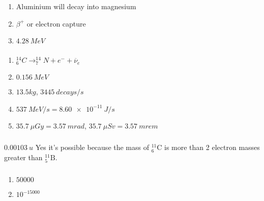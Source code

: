 \documentclass{article}
\begin{document}
\begin{enumerate}
  \item Aluminium will decay into magnesium

  \item $\beta^+$ or electron capture

  \item $\qty{4.28}{MeV}$
\end{enumerate}

\setcounter{subsubsection}{54}
\subsubsection{}

\begin{enumerate}
  \item $^{14}_6 C \rightarrow ^{14}_7 N + e^- + \overline{\nu}_e$

  \item $\qty{0.156}{MeV}$

  \item $\num{13.5}{kg}$, $\qty{3445}{decays/s}$

  \item $\qty{537}{MeV/s} = \qty{8.60e-11}{J/s}$

  \item $\qty{35.7}{\mu Gy} = \qty{3.57}{mrad}$, $\qty{35.7}{\mu Sv} = \qty{3.57}{mrem}$
\end{enumerate}

\setcounter{subsubsection}{56}
\subsubsection{}

$\qty{0.00103}{u}$ Yes it's possible because the mass of $^{11}_6 \text{C}$ is more than 2 electron masses greater than $^{11}_5 \text{B}$.

\setcounter{subsubsection}{58}
\subsubsection{}

\begin{enumerate}
  \item $\num{50000}$

  \item $10^{-15000}$
\end{enumerate}

\setcounter{subsubsection}{60}
\subsubsection{}
\end{document}
